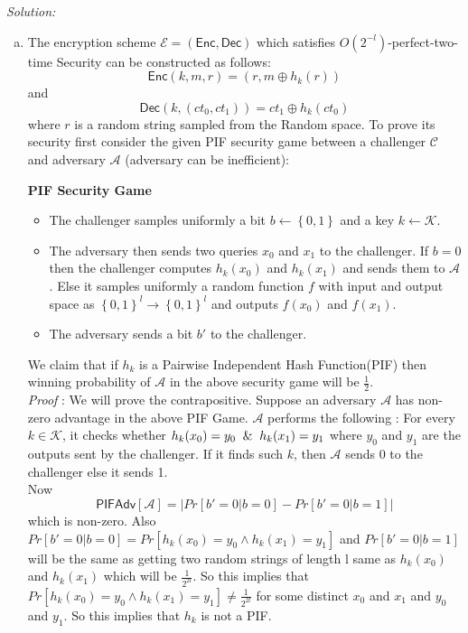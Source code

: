\documentclass[a4paper, 11pt]{article}
\newenvironment{solution}
    {\textit{Solution:}}
    {\clearpage}
\newcommand{\bit}{\left\{0, 1\right\}}
\newcommand{\enc}{\mathsf{Enc}}
\newcommand{\dec}{\mathsf{Dec}}
\newcommand{\calA}{\mathcal{A}}
\newcommand{\calC}{\mathcal{C}}
\newcommand{\calE}{\mathcal{E}}
\newcommand{\calK}{\mathcal{K}}
\begin{document}
\begin{solution}
\begin{enumerate}[(a)]
        \item The encryption scheme $\calE = (\enc, \dec)$ which satisfies $ O(2^{-l}) $-perfect-two-time Security can be constructed as follows:
            $$\enc(k, m, r) = (r, m \oplus h_k(r))$$ and
            $$\dec(k, (ct_0, ct_1)) = ct_1 \oplus h_k(ct_0) $$
            where $r$ is a random string sampled from the Random space.
        To prove its security first consider the given PIF security game between a challenger $\calC$ and adversary $\calA$ (adversary can be inefficient):
        \begin{center}
            \textbf{PIF Security Game}
            \begin{itemize}
                \item The challenger samples uniformly a bit $b \gets \bit$ and a key $k \gets \calK$. 
                \item The adversary then sends two queries $x_0$ and $x_1$ to the challenger. If $b = 0$ then the challenger computes $h_k(x_0)$ and $h_k(x_1)$ and sends them to $\calA$. Else it samples uniformly a random function $f$ with input and output space as $\bit^{l} \rightarrow \bit^{l}$ and outputs $f(x_0)$ and $f(x_1)$.
                \item The adversary sends a bit $b'$ to the challenger.
            \end{itemize}
        \end{center}
        We claim that if $h_k$ is a Pairwise Independent Hash Function(PIF) then winning probability of $\calA$ in the above security game will be $\frac{1}{2}$. \\
        \textit{Proof} : We will prove the contrapositive. Suppose an adversary $\calA$ has non-zero advantage in the above PIF Game. $\calA$ performs the following : For every $k \in \calK$, it checks whether $h_k(x_0) = y_0 \And h_k(x_1) = y_1$ where $y_0$ and $y_1$ are the outputs sent by the challenger. If it finds such $k$, then $\calA$ sends $0$ to the challenger else it sends 1. \\ 
        Now $$\mathsf{PIFAdv}[\calA] = \Big| Pr[b'=0|b=0]-Pr[b'=0|b=1] \Big|$$ which is non-zero.
        Also $Pr[b'=0|b=0] = Pr[h_k(x_0) = y_0 \land h_k(x_1) = y_1]$
        and $Pr[b'=0|b=1]$ will be the same as getting two random strings of length l same as $h_k(x_0)$ and $h_k(x_1)$ which will be $\frac{1}{2^{2l}}$. So this implies that $Pr[h_k(x_0) = y_0 \land h_k(x_1) = y_1] \ne \frac{1}{2^{2l}}$ for some distinct $x_0$ and $x_1$ and $y_0$ and $y_1$. So this implies that $h_k$ is not a PIF.\\


\end{enumerate}
\end{solution}
\end{document}
